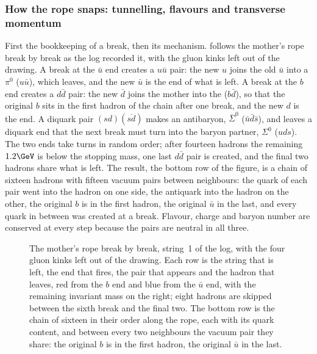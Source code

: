 \subsubsection{How the rope snaps: tunnelling, flavours and transverse momentum}
\label{sec:children_getting_married:breakup}

First the bookkeeping of a break, then its mechanism.
 follows the mother's
rope break by break as the  log recorded it, with the gluon kinks
left out of the drawing. A break at the $\bar u$ end creates a $u\bar u$
pair: the new $u$ joins the old $\bar u$ into a $\pi^0$ ($u\bar u$), which
leaves, and the new $\bar u$ is the end of what is left. A break at the
$b$ end creates a $d\bar d$ pair: the new $\bar d$ joins the mother into
the \Bstarbar ($b\bar d$), so that the original $b$ sits in the first
hadron of the chain after one break, and the new $d$ is the end. A diquark
pair $(sd)(\overline{sd})$ makes an antibaryon, $\bar\Sigma^0$
($\bar u\bar d\bar s$), and leaves a diquark end that the next break must
turn into the baryon partner, $\Sigma^0$ ($uds$). The two ends take turns
in random order; after fourteen hadrons the remaining $1.2\GeV$ is below
the stopping mass, one last $d\bar d$ pair is created, and the final two
hadrons share what is left. The result, the bottom row of the figure, is a
chain of sixteen hadrons with fifteen vacuum pairs between neighbours: the
quark of each pair went into the hadron on one side, the antiquark into
the hadron on the other, the original $b$ is in the first hadron, the
original $\bar u$ in the last, and every quark in between was created at a
break. Flavour, charge and baryon number are conserved at every step
because the pairs are neutral in all three.

\begin{figure}[htbp]\centering
\resizebox{\textwidth}{!}{}
\caption[The mother's rope break by break]{The mother's rope break by
break, string~1 of the  log, with the four gluon kinks left out
of the drawing. Each row is the string that is left, the end that fires,
the pair that appears and the hadron that leaves, red from the $b$ end and
blue from the $\bar u$ end, with the remaining invariant mass on the
right; eight hadrons are skipped between the sixth break and the final
two. The bottom row is the chain of sixteen in their order along the rope,
each with its quark content, and between every two neighbours the vacuum
pair they share: the original $b$ is in the first hadron, the original
$\bar u$ in the last.}
\label{fig:children_getting_married:chain_sketch}
\end{figure}

